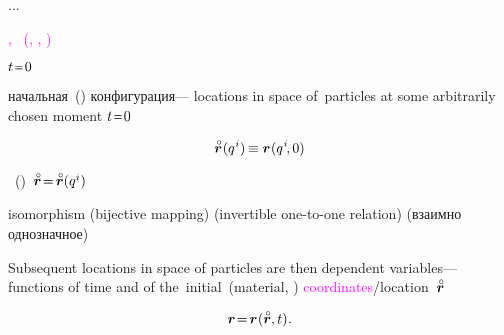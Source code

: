 ...

\begin{otherlanguage}{russian}


\emph{ }

\textcolor{magenta}{,  ~(, , ) }

 ${t \narroweq 0}$

 начальная~() конфигурация\:---
locations in space of~particles at some arbitrarily chosen  moment ${t \narroweq 0}$

\nopagebreak\vspace{-0.1em}\begin{equation*}
\initiallocationvector \hspace{.1ex} (q^{\hspace{.1ex}i}) \hspace{-0.2ex}
\equiv
\locationvector \hspace{.1ex} (q^{\hspace{.1ex}i} \hspace{-0.33ex}, 0)
\end{equation*}

~()~${\initiallocationvector \hspace{-0.4ex} = \hspace{-0.3ex} \initiallocationvector(q^{i})}$

isomorphism (bijective mapping) (invertible one\hbox{-}to\hbox{-}one relation) (взаимно однозначное)


Subsequent locations in space of particles are then dependent variables\:--- functions of time and of the~initial~(material, ) \textcolor{magenta}{coordinates}/location~${\initiallocationvector}$

\nopagebreak\vspace{-1em}\begin{equation*}
\currentlocationvector \hspace{-0.4ex} = \hspace{-0.3ex} \currentlocationvector \hspace{.1ex} (\initiallocationvector, t)
\hspace{.1ex} .
\end{equation*}


\end{otherlanguage}
